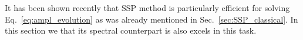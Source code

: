\documentclass[11pt,a4paper]{article}
\theoremstyle{plain}%
\theoremstyle{definition}
\theoremstyle{remark}
\begin{document}

It has been shown recently that SSP method is particularly efficient for solving Eq.~\eqref{eq:ampl_evolution} \cite{PETROV2020115526, petrovantoine2020} as was already mentioned in Sec.~\ref{sec:SSP_classical}. 
In this section we that its spectral counterpart is also excels in this task. 


%         
%         
%         
\end{document}
